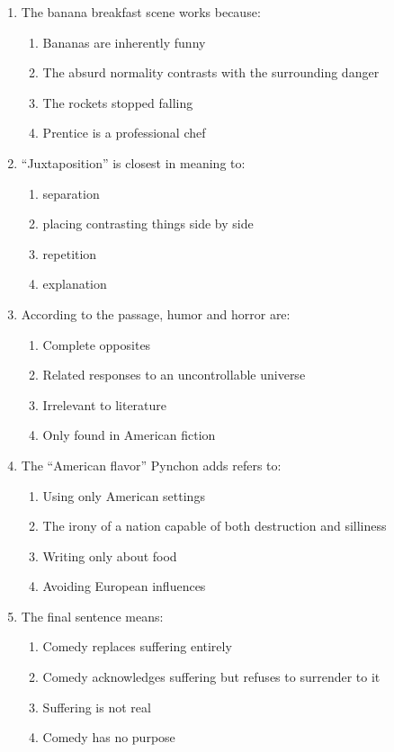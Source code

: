 \documentclass[10pt,a4paper]{article}
\begin{document}
\begin{enumerate}[label=\textbf{\arabic*.}, start=21]
\item The banana breakfast scene works because:
\begin{enumerate}[label=(\Alph*)]
\item Bananas are inherently funny
\item The absurd normality contrasts with the surrounding danger
\item The rockets stopped falling
\item Prentice is a professional chef
\end{enumerate}

\item ``Juxtaposition'' is closest in meaning to:
\begin{enumerate}[label=(\Alph*)]
\item separation \item placing contrasting things side by side
\item repetition \item explanation
\end{enumerate}

\item According to the passage, humor and horror are:
\begin{enumerate}[label=(\Alph*)]
\item Complete opposites
\item Related responses to an uncontrollable universe
\item Irrelevant to literature
\item Only found in American fiction
\end{enumerate}

\item The ``American flavor'' Pynchon adds refers to:
\begin{enumerate}[label=(\Alph*)]
\item Using only American settings
\item The irony of a nation capable of both destruction and silliness
\item Writing only about food
\item Avoiding European influences
\end{enumerate}

\item The final sentence means:
\begin{enumerate}[label=(\Alph*)]
\item Comedy replaces suffering entirely
\item Comedy acknowledges suffering but refuses to surrender to it
\item Suffering is not real
\item Comedy has no purpose
\end{enumerate}
\end{enumerate}
\end{document}
